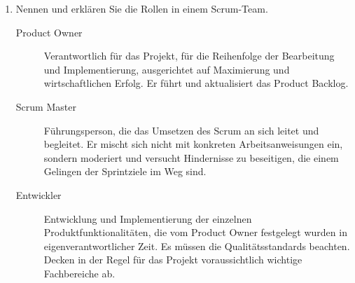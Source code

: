 \documentclass{lehramt-informatik-aufgabe}
\begin{document}
\begin{enumerate}
\begin{liAntwort}
\begin{enumerate}
\item Sprint planning:

Der nächste Sprint (zwischen 1 und 4 Wochen) wird geplant. Dabei wird
ein Teil des Product Backlog als Sprint Backlog definiert und auf die
einzelnen Entwickler verteilt. Es wird festgelt, was implementiert
werden soll (Product Owner anwesend) und im zweiten Teil wie das
geschehen soll (Entwicklerteam). Während des Sprints findet jeden Tag
ein Daily Scrum statt, ein fünfzehnminütiger Austausch zum aktuellen
Stand. Am Ende des Sprints gibt es ein Sprint Review und das Product
Inkrement wird evaluiert und das Product Backlog gegebenenfalls
angepasst in Absprache mit Product Owner und
Stakeholdern.


\begin{itemize}
\item Product Backlog
\item Sprint Backlog
\item Product Increment\footcite[Seite 230-231]{schneider}
\end{itemize}
\end{enumerate}
\end{liAntwort}


\item Nennen und erklären Sie die Rollen in einem Scrum-Team.

\begin{liAntwort}
\begin{description}
\item[Product Owner]

Verantwortlich für das Projekt, für die Reihenfolge der Bearbeitung und
Implementierung, ausgerichtet auf Maximierung und wirtschaftlichen
Erfolg. Er führt und aktualisiert das Product Backlog.

\item[Scrum Master]

Führungsperson, die das Umsetzen des Scrum an sich leitet und begleitet.
Er mischt sich nicht mit konkreten Arbeitsanweisungen ein, sondern
moderiert und versucht Hindernisse zu beseitigen, die einem Gelingen der
Sprintziele im Weg sind.

\item[Entwickler]

Entwicklung und Implementierung der einzelnen Produktfunktionalitäten,
die vom Product Owner festgelegt wurden in eigenverantwortlicher Zeit.
Es müssen die Qualitätsstandards beachten. Decken in der Regel für das
Projekt voraussichtlich wichtige Fachbereiche ab.
\end{description}
\end{liAntwort}
\end{enumerate}
\end{document}
